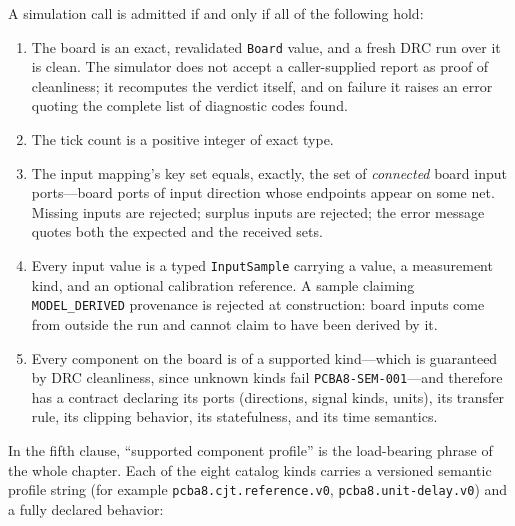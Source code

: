 \begin{ruleenv}[Admission]\label{ch08:rule:admission}
A simulation call is admitted if and only if all of the following hold:
\begin{enumerate}
\item The board is an exact, revalidated \texttt{Board} value, and a fresh DRC run over it is clean. The simulator does not accept a caller-supplied report as proof of cleanliness; it recomputes the verdict itself, and on failure it raises an error quoting the complete list of diagnostic codes found.
\item The tick count is a positive integer of exact type.
\item The input mapping's key set equals, exactly, the set of \emph{connected} board input ports---board ports of input direction whose endpoints appear on some net. Missing inputs are rejected; surplus inputs are rejected; the error message quotes both the expected and the received sets.
\item Every input value is a typed \texttt{InputSample} carrying a value, a measurement kind, and an optional calibration reference. A sample claiming \texttt{MODEL\_DERIVED} provenance is rejected at construction: board inputs come from outside the run and cannot claim to have been derived by it.
\item Every component on the board is of a supported kind---which is guaranteed by DRC cleanliness, since unknown kinds fail \texttt{PCBA8-SEM-001}---and therefore has a contract declaring its ports (directions, signal kinds, units), its transfer rule, its clipping behavior, its statefulness, and its time semantics.
\end{enumerate}
\end{ruleenv}

In the fifth clause, ``supported component profile'' is the load-bearing phrase of the whole chapter. Each of the eight catalog kinds carries a versioned semantic profile string (for example \texttt{pcba8.cjt.reference.v0}, \texttt{pcba8.unit-delay.v0}) and a fully declared behavior:

